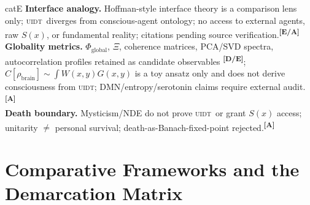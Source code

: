 \documentclass[12pt,a4paper,twoside]{article}
\theoremstyle{plain}
\theoremstyle{definition}
\theoremstyle{remark}
\newcommand{\UIDT}{\textsc{uidt}}
\newcommand{\catmark}[1]{\textsuperscript{\textsf{\textbf{[#1]}}}}
\begin{document}
\begin{evidencebox}{catE}
\textbf{Interface analogy.} Hoffman-style interface theory is a comparison lens only; \UIDT\ diverges from conscious-agent ontology; no access to external agents, raw $S(x)$, or fundamental reality; citations pending source
verification.\catmark{E/A}\\[0.3em]
\textbf{Globality metrics.} $\Phi_{\mathrm{global}}$, $\Xi$, coherence matrices, PCA/SVD spectra, autocorrelation profiles retained as candidate observables \catmark{D/E}; $C[\rho_{\mathrm{brain}}]\sim\int W(x,y)G(x,y)$ is a toy ansatz only and does not derive consciousness from \UIDT; DMN/entropy/serotonin claims
require external audit.\catmark{A}\\[0.3em]
\textbf{Death boundary.} Mysticism/NDE do not prove \UIDT\ or grant $S(x)$ access; unitarity $\neq$ personal survival; death-as-Banach-fixed-point rejected.\catmark{A}
\end{evidencebox}


\section{Comparative Frameworks and the Demarcation Matrix}
\label{sec:orch-or-comparison}
\end{document}

